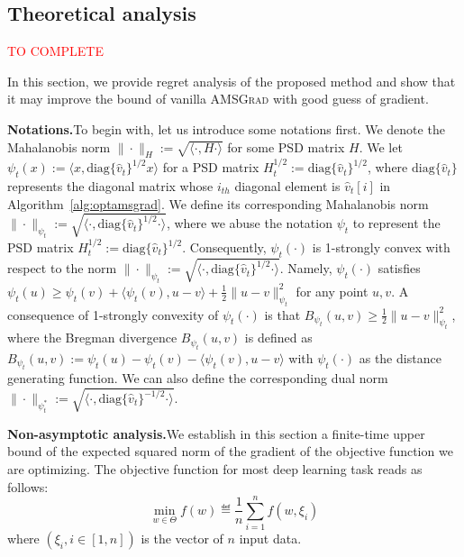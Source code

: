 \documentclass[11pt]{article}
\theoremstyle{k}
\begin{document}


\subsection{Theoretical analysis}
\textcolor{red}{TO COMPLETE}

In this section, we provide regret analysis of the proposed method and show that it may improve the bound of vanilla \textsc{AMSGrad} with good guess of gradient.

\textbf{Notations.}\hspace{0.1in}To begin with, let us introduce some notations first.
We denote the Mahalanobis norm $\|\cdot\|_H := \sqrt{ \langle \cdot, H \cdot \rangle }$ for some PSD matrix $H$.
We let $\psi_t(x) := \langle x, \text{diag}\{\hat{v}_t\}^{1/2} x \rangle$ for a PSD matrix $H_t^{1/2}:= \text{diag}\{\hat{v}_t\}^{1/2}$, 
where $\text{diag}\{\hat{v}_t\}$ represents the diagonal matrix whose $i_{th}$ diagonal element is $\hat{v}_t[i]$ in Algorithm~\ref{alg:optamsgrad}.
We define its corresponding Mahalanobis norm $\| \cdot \|_{\psi_t}:= 
\sqrt{ \langle \cdot, \text{diag}\{\hat{v}_t\}^{1/2} \cdot \rangle }$,
where we abuse the notation $\psi_t$ to represent the PSD matrix $H_t^{1/2}:=\text{diag}\{\hat{v}_t\}^{1/2}$.
Consequently,
$\psi_t(\cdot)$ is 1-strongly convex with respect to the norm $\| \cdot \|_{\psi_t}:= 
\sqrt{ \langle \cdot, \text{diag}\{\hat{v}_t\}^{1/2} \cdot \rangle }$.
Namely, $\psi_t(\cdot)$ satisfies
$\psi_t(u) \geq \psi_t(v) + \langle \psi_t(v), u - v \rangle + \frac{1}{2} \| u - v\|^2_{\psi_t}$
for any point $u,v$.
A consequence of 1-strongly convexity of $\psi_t(\cdot)$ is that
$B_{\psi_t}(u,v) \geq \frac{1}{2} \| u - v \|^2_{\psi_t}$,
where the Bregman divergence $B_{\psi_t}(u,v)$ is defined as 
$B_{\psi_t}(u,v) := \psi_t(u)
- \psi_t(v) - \langle \psi_t(v), u - v \rangle
$ with $\psi_t(\cdot)$ as the distance generating function.
We can also define the corresponding dual norm $\| \cdot \|_{\psi_t^*}:= \sqrt{ \langle \cdot, \text{diag}\{\hat{v}_t\}^{-1/2} \cdot \rangle }$.

\textbf{Non-asymptotic analysis.}\hspace{0.1in}We establish in this section a finite-time upper bound of the expected squared norm of the gradient of the objective function we are optimizing.
The objective function for most deep learning task reads as follows:
\begin{equation}\label{eq:minproblem}
\min \limits_{w \in \Theta} f(w) \eqdef  \frac{1}{n} \sum_{i=1}^n f(w, \xi_i)
\end{equation}
where $(\xi_i, i \in [1,n])$ is the vector of $n$ input data.
\end{document}
